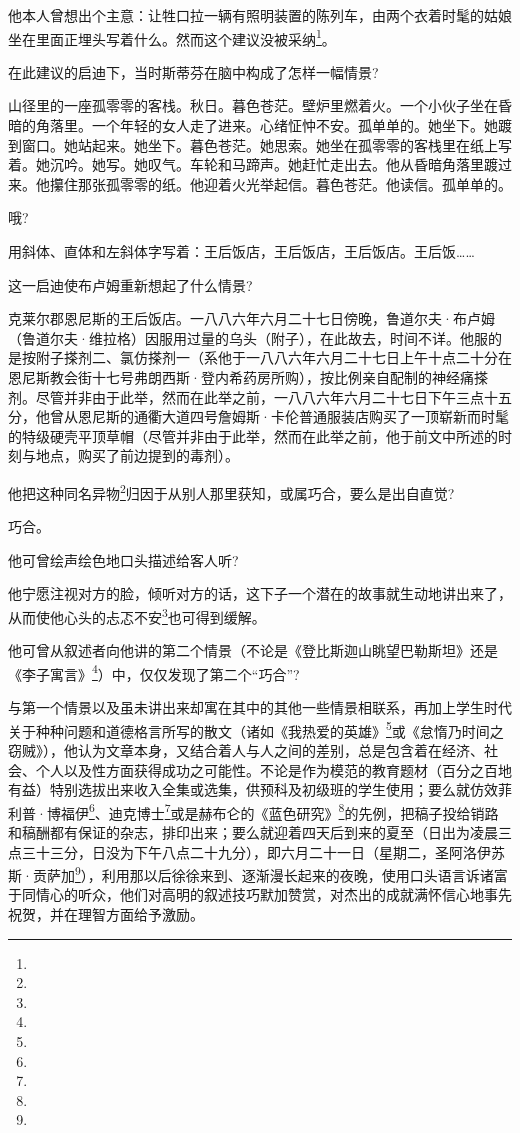\par 他本人曾想出个主意：让牲口拉一辆有照明装置的陈列车，由两个衣着时髦的姑娘坐在里面正埋头写着什么。然而这个建议没被采纳\footnote{}。
\par 在此建议的启迪下，当时斯蒂芬在脑中构成了怎样一幅情景?
\par 山径里的一座孤零零的客栈。秋日。暮色苍茫。壁炉里燃着火。一个小伙子坐在昏暗的角落里。一个年轻的女人走了进来。心绪怔忡不安。孤单单的。她坐下。她踱到窗口。她站起来。她坐下。暮色苍茫。她思索。她坐在孤零零的客栈里在纸上写着。她沉吟。她写。她叹气。车轮和马蹄声。她赶忙走出去。他从昏暗角落里踱过来。他攥住那张孤零零的纸。他迎着火光举起信。暮色苍茫。他读信。孤单单的。
\par 哦?
\par 用斜体、直体和左斜体字写着：王后饭店，王后饭店，王后饭店。王后饭……
\par 这一启迪使布卢姆重新想起了什么情景?
\par 克莱尔郡恩尼斯的王后饭店。一八八六年六月二十七日傍晚，鲁道尔夫·布卢姆（鲁道尔夫·维拉格）因服用过量的乌头（附子），在此故去，时间不详。他服的是按附子搽剂二、氯仿搽剂一（系他于一八八六年六月二十七日上午十点二十分在恩尼斯教会街十七号弗朗西斯·登内希药房所购），按比例亲自配制的神经痛搽剂。尽管并非由于此举，然而在此举之前，一八八六年六月二十七日下午三点十五分，他曾从恩尼斯的通衢大道四号詹姆斯·卡伦普通服装店购买了一顶崭新而时髦的特级硬壳平顶草帽（尽管并非由于此举，然而在此举之前，他于前文中所述的时刻与地点，购买了前边提到的毒剂）。
\par 他把这种同名异物\footnote{}归因于从别人那里获知，或属巧合，要么是出自直觉?
\par 巧合。
\par 他可曾绘声绘色地口头描述给客人听?
\par 他宁愿注视对方的脸，倾听对方的话，这下子一个潜在的故事就生动地讲出来了，从而使他心头的忐忑不安\footnote{}也可得到缓解。
\par 他可曾从叙述者向他讲的第二个情景（不论是《登比斯迦山眺望巴勒斯坦》还是《李子寓言》\footnote{}）中，仅仅发现了第二个“巧合”?
\par 与第一个情景以及虽未讲出来却寓在其中的其他一些情景相联系，再加上学生时代关于种种问题和道德格言所写的散文（诸如《我热爱的英雄》\footnote{}或《怠惰乃时间之窃贼》），他认为文章本身，又结合着人与人之间的差别，总是包含着在经济、社会、个人以及性方面获得成功之可能性。不论是作为模范的教育题材（百分之百地有益）特别选拔出来收入全集或选集，供预科及初级班的学生使用；要么就仿效菲利普·博福伊\footnote{}、迪克博士\footnote{}或是赫布仑的《蓝色研究》\footnote{}的先例，把稿子投给销路和稿酬都有保证的杂志，排印出来；要么就迎着四天后到来的夏至（日出为凌晨三点三十三分，日没为下午八点二十九分），即六月二十一日（星期二，圣阿洛伊苏斯·贡萨加\footnote{}），利用那以后徐徐来到、逐渐漫长起来的夜晚，使用口头语言诉诸富于同情心的听众，他们对高明的叙述技巧默加赞赏，对杰出的成就满怀信心地事先祝贺，并在理智方面给予激励。
